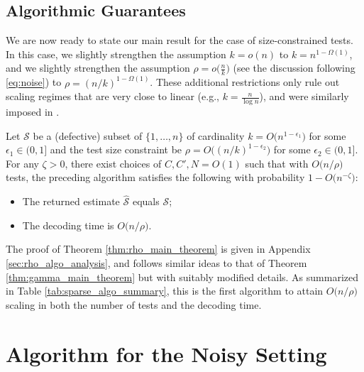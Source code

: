 \subsection{Algorithmic Guarantees}

We are now ready to state our main result for the case of size-constrained tests.   In this case, we slightly strengthen the assumption $k = o(n)$ to $k = n^{1-\Omega(1)}$, and we slightly strengthen the assumption $\rho = o\big( \frac{n}{k} \big)$ (see the discussion following \eqref{eq:noise}) to $\rho=(n/k)^{1-\Omega(1)}$.  These additional restrictions only rule out scaling regimes that are very close to linear (e.g., $k = \frac{n}{\log n}$), and were similarly imposed in \cite{Ven19}.

\begin{theorem} \label{thm:rho_main_theorem}
Let $\mathcal{S}$ be a (defective) subset of $\{1,\dots,n\}$ of cardinality $k=O\big(n^{1-\epsilon_1}\big)$ for some $\epsilon_1\in(0,1]$ and the test size constraint be $\rho=O\big((n/k)^{1-\epsilon_2}\big)$ for some $\epsilon_2\in(0,1]$. For any $\zeta > 0$, there exist choices of $C,C',N=O(1)$ such that with $O\big(n/\rho\big)$ tests, the preceding algorithm satisfies the following with probability $1 - O\big(n^{-\zeta}\big)$:
\begin{itemize}
    \item The returned estimate $\widehat{\mathcal{S}}$ equals $\mathcal{S}$;
    \item The decoding time is $O\big(n/\rho\big)$.
\end{itemize}
\end{theorem}

The proof of Theorem \ref{thm:rho_main_theorem} is given in Appendix \ref{sec:rho_algo_analysis}, and follows similar ideas to that of Theorem \ref{thm:gamma_main_theorem} but with suitably modified details. As summarized in Table \ref{tab:sparse_algo_summary}, this is the first algorithm to attain $O\big(n/\rho\big)$ scaling in both the number of tests and the decoding time. 


\section{Algorithm for the Noisy Setting} \label{sec:noisy_algo_intro}


